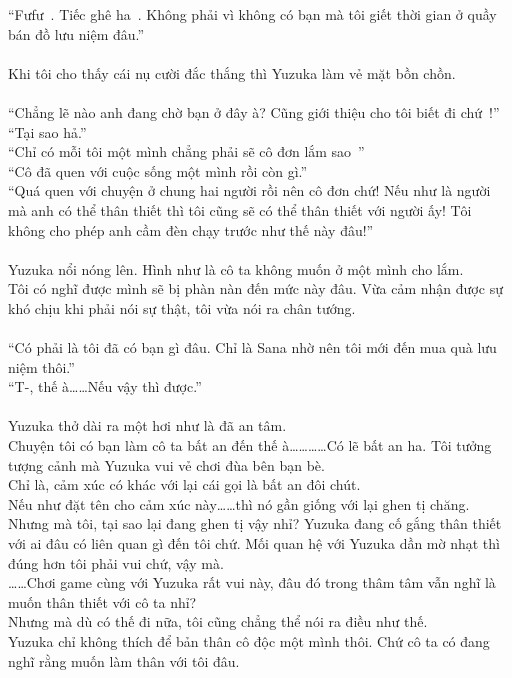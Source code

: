 \documentclass[12pt,a4paper, twosides]{book}
\begin{document}
“Fưfư~. Tiếc ghê ha~. Không phải vì không có bạn mà tôi giết thời gian ở quầy bán đồ lưu niệm đâu.”\\
\\
Khi tôi cho thấy cái nụ cười đắc thắng thì Yuzuka làm vẻ mặt bồn chồn.\\
\\
“Chẳng lẽ nào anh đang chờ bạn ở đây à? Cũng giới thiệu cho tôi biết đi chứ~!”\\
“Tại sao hả.”\\
“Chỉ có mỗi tôi một mình chẳng phải sẽ cô đơn lắm sao~”\\
“Cô đã quen với cuộc sống một mình rồi còn gì.”\\
“Quá quen với chuyện ở chung hai người rồi nên cô đơn chứ! Nếu như là người mà anh có thể thân thiết thì tôi cũng sẽ có thể thân thiết với người ấy! Tôi không cho phép anh cầm đèn chạy trước như thế này đâu!”\\
\\
Yuzuka nổi nóng lên. Hình như là cô ta không muốn ở một mình cho lắm.\\
Tôi có nghĩ được mình sẽ bị phàn nàn đến mức này đâu. Vừa cảm nhận được sự khó chịu khi phải nói sự thật, tôi vừa nói ra chân tướng.\\
\\
“Có phải là tôi đã có bạn gì đâu. Chỉ là Sana nhờ nên tôi mới đến mua quà lưu niệm thôi.”\\
“T-, thế à……Nếu vậy thì được.”\\
\\
Yuzuka thở dài ra một hơi như là đã an tâm.\\
Chuyện tôi có bạn làm cô ta bất an đến thế à…………Có lẽ bất an ha. Tôi tưởng tượng cảnh mà Yuzuka vui vẻ chơi đùa bên bạn bè.\\
Chỉ là, cảm xúc có khác với lại cái gọi là bất an đôi chút.\\
Nếu như đặt tên cho cảm xúc này……thì nó gần giống với lại ghen tị chăng.\\
Nhưng mà tôi, tại sao lại đang ghen tị vậy nhỉ? Yuzuka đang cố gắng thân thiết với ai đâu có liên quan gì đến tôi chứ. Mối quan hệ với Yuzuka dần mờ nhạt thì đúng hơn tôi phải vui chứ, vậy mà.\\
……Chơi game cùng với Yuzuka rất vui này, đâu đó trong thâm tâm vẫn nghĩ là muốn thân thiết với cô ta nhỉ?\\
Nhưng mà dù có thế đi nữa, tôi cũng chẳng thể nói ra điều như thế.\\
Yuzuka chỉ không thích để bản thân cô độc một mình thôi. Chứ cô ta có đang nghĩ rằng muốn làm thân với tôi đâu.\\
\end{document}
